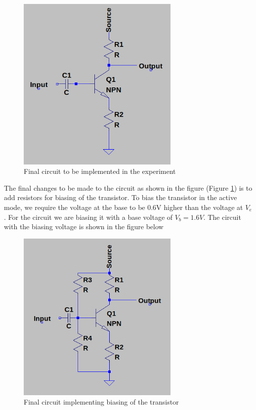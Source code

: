 \documentclass[12pt, a4paper]{article}
\begin{document}
 	\begin{figure}[H]
 		\centering
		\label{fig:final_transistor_circuit}
		\includegraphics[width=0.7\textwidth]{images/final_transistor_circuit.png}
		\caption{Final circuit to be implemented in the experiment}
 	\end{figure}

 	The final changes to be made to the circuit as shown in the figure (Figure \ref{fig:final_transistor_circuit}) is to add resistors for biasing of the transistor. To bias the transistor in the active mode, we require the voltage at the base to be 0.6V higher than the voltage at $V_e$. For the circuit we are biasing it with a base voltage of $V_b = 1.6V$. The circuit with the biasing voltage is shown in the figure below 

 	\begin{figure}[H]
 		\centering
		\label{fig:biasing_transistor}
		\includegraphics[width=0.7\textwidth]{images/biasing_transistor_circuit.png}
		\caption{Final circuit implementing biasing of the transistor}
 	\end{figure}
\end{document}
